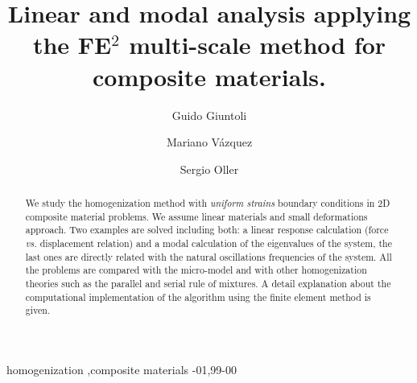 \documentclass[preprint]{elsarticle}
\begin{document}
\begin{frontmatter}

\title{Linear and modal analysis applying the FE$^2$ multi-scale method for composite materials.}

\author{Guido Giuntoli}
\address{Carrer Jordi Girona 29, Barcelona}
\author{Mariano V\'azquez}
\address{Carrer Jordi Girona 29, Barcelona}
\author{Sergio Oller}
\address{Carrer Jordi Girona 29, Barcelona}





\begin{abstract}
We study the homogenization method with \emph{uniform strains} boundary
conditions in 2D composite material problems.
We assume linear materials and small deformations approach.
Two examples are solved including both: a linear response calculation (force
\emph{vs.} displacement relation) and a modal calculation of the eigenvalues 
of the system, the last ones are directly related with the natural oscillations 
frequencies of the system.
All the problems are compared with the micro-model and with other homogenization 
theories such as the parallel and serial rule of mixtures.
A detail explanation about the computational implementation of the algorithm using 
the finite element method is given.
\end{abstract}

\begin{keyword}
homogenization \sep composite materials 
-01\sep  99-00
\end{keyword}
 
\end{frontmatter}
\end{document}
